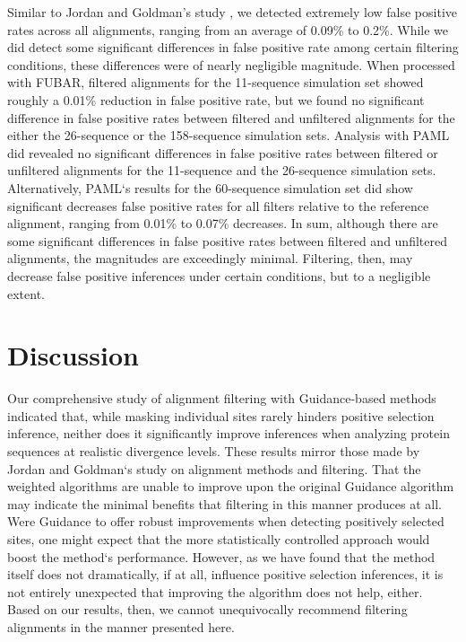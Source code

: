 \documentclass[10pt]{article}
\begin{document}
Similar to Jordan and Goldman's study \citep{Jordan2011}, we detected extremely low false positive rates across all alignments, ranging from an average of 0.09\% to 0.2\%. While we did detect some significant differences in false positive rate among certain filtering conditions, these differences were of nearly negligible magnitude. When processed with FUBAR, filtered alignments for the 11-sequence simulation set showed roughly a 0.01\% reduction in false positive rate, but we found no significant difference in false positive rates between filtered and unfiltered alignments for the either the 26-sequence or the 158-sequence simulation sets. 
Analysis with PAML did revealed no significant differences in false positive rates between filtered or unfiltered alignments for the 11-sequence and the 26-sequence simulation sets. Alternatively, PAML`s results for the 60-sequence simulation set did show significant decreases false positive rates for all filters relative to the reference alignment, ranging from 0.01\% to 0.07\% decreases. In sum, although there are some significant differences in false positive rates between filtered and unfiltered alignments, the magnitudes are exceedingly minimal. Filtering, then, may decrease false positive inferences under certain conditions, but to a negligible extent.
























\section*{Discussion}

Our comprehensive study of alignment filtering with Guidance-based methods indicated that, while masking individual sites rarely hinders positive selection inference, neither does it significantly improve inferences when analyzing protein sequences at realistic divergence levels. These results mirror those made by Jordan and Goldman`s \citep{Jordan2011} study on alignment methods and filtering. That the weighted algorithms are unable to improve upon the original Guidance algorithm may indicate the minimal benefits that filtering in this manner produces at all. Were Guidance to offer robust improvements when detecting positively selected sites, one might expect that the more statistically controlled approach would boost the method`s performance. However, as we have found that the method itself does not dramatically, if at all, influence positive selection inferences, it is not entirely unexpected that improving the algorithm does not help, either. Based on our results, then, we cannot unequivocally recommend filtering alignments in the manner presented here. 
\end{document}
